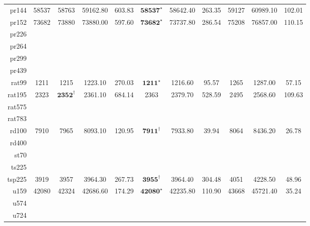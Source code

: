 \documentclass[12pt]{ctexart}
\begin{document}
\begin{table}[htbp]
\begin{tabular}{rcccccccccc}
        pr144    & 58537            & 58763                             & 59162.80                    & 603.83                                 & $\textbf{58537}^\star$  & 58642.40         & 263.35           & 59127                 & 60989.10         & 102.01           \\
        pr152    & 73682            & 73880                             & 73880.00                    & 597.60                                 & $\textbf{73682}^\star$  & 73737.80         & 286.54           & 75208                 & 76857.00         & 110.15           \\
        pr226 \\
        pr264 \\
        pr299 \\ 
        pr439 \\
        rat99    & 1211             & 1215                              & 1223.10                     & 270.03                                 & $\textbf{1211}^\star$   & 1216.60          & 95.57            & 1265                  & 1287.00          & 57.15            \\
        rat195   & 2323             & $\textbf{2352}^\dag$              & 2361.10                     & 684.14                                 & 2363                    & 2379.70          & 528.59           & 2495                  & 2568.60          & 109.63           \\
        rat575 \\
        rat783 \\
        rd100    & 7910             & 7965                              & 8093.10                     & 120.95                                 & $\textbf{7911}^\dag$    & 7933.80          & 39.94            & 8064                  & 8436.20          & 26.78            \\
        rd400 \\
        st70 \\
        ts225 \\
        tsp225   & 3919             & 3957                              & 3964.30                     & 267.73                                 & $\textbf{3955}^\dag$    & 3964.40          & 304.48           & 4051                  & 4228.50          & 48.96            \\
        u159     & 42080            & 42324                             & 42686.60                    & 174.29                                 & $\textbf{42080}^\star$  & 42235.80         & 110.90           & 43668                 & 45721.40         & 35.24            \\
        u574 \\
        u724 \\
        \bottomrule
    \end{tabular}
\end{table}
\end{document}
